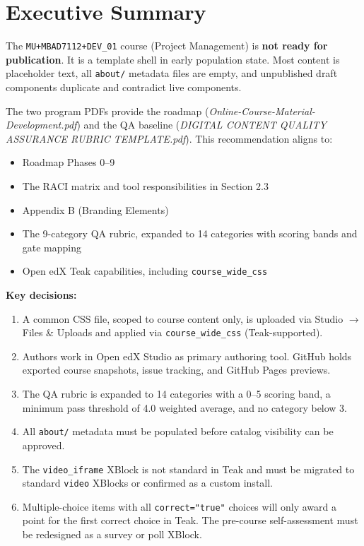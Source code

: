 \chapter{Executive Summary}

The \texttt{MU+MBAD7112+DEV\_01} course (Project Management) is
\textbf{not ready for publication}. It is a template shell in early
population state. Most content is placeholder text, all \texttt{about/}
metadata files are empty, and unpublished draft components duplicate
and contradict live components.

The two program PDFs provide the roadmap
(\textit{Online-Course-Material-Development.pdf}) and the QA baseline
(\textit{DIGITAL CONTENT QUALITY ASSURANCE RUBRIC TEMPLATE.pdf}). This
recommendation aligns to:

\begin{itemize}
  \item Roadmap Phases 0--9
  \item The RACI matrix and tool responsibilities in Section 2.3
  \item Appendix B (Branding Elements)
  \item The 9-category QA rubric, expanded to 14 categories with
        scoring bands and gate mapping
  \item Open edX Teak capabilities, including \texttt{course\_wide\_css}
\end{itemize}

\textbf{Key decisions:}
\begin{enumerate}
  \item A common CSS file, scoped to course content only, is uploaded
        via Studio $\to$ Files \& Uploads and applied via
        \texttt{course\_wide\_css} (Teak-supported).
  \item Authors work in Open edX Studio as primary authoring tool.
        GitHub holds exported course snapshots, issue tracking, and
        GitHub Pages previews.
  \item The QA rubric is expanded to 14 categories with a 0--5 scoring
        band, a minimum pass threshold of 4.0 weighted average, and
        no category below 3.
  \item All \texttt{about/} metadata must be populated before catalog
        visibility can be approved.
  \item The \texttt{video\_iframe} XBlock is not standard in Teak and
        must be migrated to standard \texttt{video} XBlocks or
        confirmed as a custom install.
  \item Multiple-choice items with all \texttt{correct="true"} choices
        will only award a point for the first correct choice in Teak.
        The pre-course self-assessment must be redesigned as a survey
        or poll XBlock.
\end{enumerate}